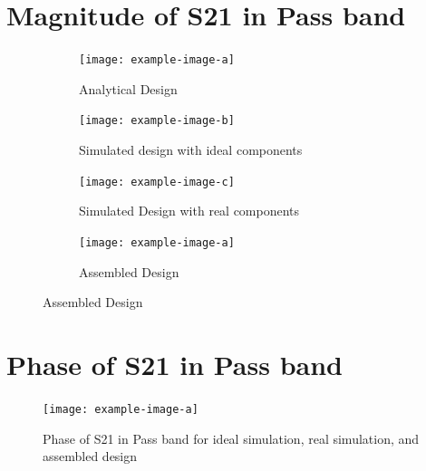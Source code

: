 \documentclass[letterpaper,12pt]{article}
\begin{document}
\section{Magnitude of S21 in Pass band}
\begin{figure}[H]
    \begin{subfigure}[t]{.49\textwidth}
      \centering
      \texttt{[image: example-image-a]}
      \caption{Analytical Design}
    \end{subfigure}
    \hfill
    \begin{subfigure}[t]{.49\textwidth}
      \centering
      \texttt{[image: example-image-b]}
      \caption{Simulated design with ideal components}
    \end{subfigure}
  
    \medskip
  
    \begin{subfigure}[t]{.49\textwidth}
      \centering
      \texttt{[image: example-image-c]}
      \caption{Simulated Design with real components}
    \end{subfigure}
    \hfill
    \begin{subfigure}[t]{.49\textwidth}
      \centering
      \texttt{[image: example-image-a]}
      \caption{Assembled Design}
    \end{subfigure}
  \end{figure}

\newpage
\section{Phase of S21 in Pass band}
\begin{figure}[H]
    \texttt{[image: example-image-a]}
    \caption{Phase of S21 in Pass band for ideal simulation, real simulation, and assembled design}
\end{figure}
\end{document}
